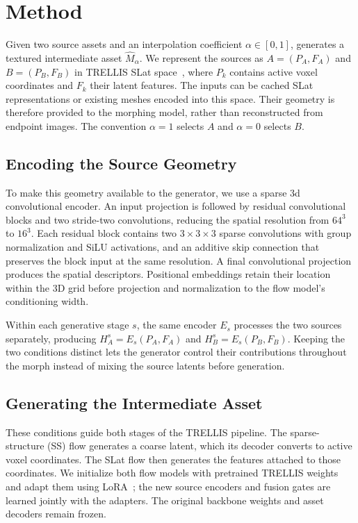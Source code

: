 \section{Method}
\label{sec:method}

Given two source assets and an interpolation coefficient $\alpha\in[0,1]$,
\methodname{} generates a textured intermediate asset $\widehat M_\alpha$.
We represent the sources as $A=(P_A,F_A)$ and $B=(P_B,F_B)$ in TRELLIS
SLat space~\cite{xiang2025trellis}, where $P_k$ contains active voxel
coordinates and $F_k$ their latent features.
The inputs can be cached SLat representations or existing meshes encoded
into this space. Their geometry is therefore provided to the morphing
model, rather than reconstructed from endpoint images.
The convention $\alpha=1$ selects $A$ and $\alpha=0$ selects $B$.

\subsection{Encoding the Source Geometry}
\label{sec:representation}

To make this geometry available to the generator, we use a sparse 3d convolutional encoder.
An input projection is followed by residual convolutional blocks and two
stride-two convolutions, reducing the spatial resolution from $64^3$ to
$16^3$.
Each residual block contains two $3\times3\times3$ sparse convolutions with
group normalization and SiLU activations, and an additive skip connection
that preserves the block input at the same resolution.
A final convolutional projection produces the spatial descriptors.
Positional embeddings retain their location within the 3D grid before
projection and normalization to the flow model's conditioning width.

Within each generative stage $s$, the same encoder $E_s$ processes the two
sources separately, producing $H_A^s=E_s(P_A,F_A)$ and
$H_B^s=E_s(P_B,F_B)$.
Keeping the two conditions distinct lets the generator control their
contributions throughout the morph instead of mixing the source latents
before generation.

\subsection{Generating the Intermediate Asset}
\label{sec:source_fusion}

These conditions guide both stages of the TRELLIS pipeline.
The sparse-structure (SS) flow generates a coarse latent, which its decoder
converts to active voxel coordinates. The SLat flow then generates the
features attached to those coordinates.
We initialize both flow models with pretrained TRELLIS weights and adapt
them using LoRA~\cite{hu2022lora}; the new source encoders and fusion gates
are learned jointly with the adapters.
The original backbone weights and asset decoders remain frozen.

